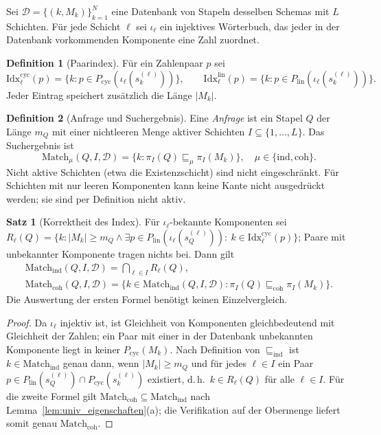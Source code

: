 \documentclass[a4paper,12pt, twoside]{report}
\theoremstyle{definition}
\newtheorem{definition}{Definition}
\newtheorem{satz}{Satz}
\begin{document}
Sei $\mathcal{D}=\{(k,M_k)\}_{k=1}^{N}$ eine Datenbank von Stapeln desselben Schemas mit $L$ Schichten. Für jede Schicht $\ell$ sei $\iota_\ell$ ein injektives Wörterbuch, das jeder in der Datenbank vorkommenden Komponente eine Zahl zuordnet.

\begin{definition}[Paarindex]
	Für ein Zahlenpaar $p$ sei
	\[
	\mathrm{Idx}^{\mathrm{cyc}}_\ell(p)=\{k : p\in P_{\mathrm{cyc}}(\iota_\ell(s_k^{(\ell)}))\},\qquad
	\mathrm{Idx}^{\mathrm{lin}}_\ell(p)=\{k : p\in P_{\mathrm{lin}}(\iota_\ell(s_k^{(\ell)}))\}.
	\]
	Jeder Eintrag speichert zusätzlich die Länge $|M_k|$.
\end{definition}

\begin{definition}[Anfrage und Suchergebnis]
	Eine \emph{Anfrage} ist ein Stapel $Q$ der Länge $m_Q$ mit einer nichtleeren Menge aktiver Schichten $I\subseteq\{1,\dots,L\}$. Das Suchergebnis ist
	\[
	\mathrm{Match}_\mu(Q,I,\mathcal{D})=\{k : \pi_I(Q)\sqsubseteq_\mu\pi_I(M_k)\},\quad \mu\in\{\mathrm{ind},\mathrm{coh}\}.
	\]
	Nicht aktive Schichten (etwa die Existenzschicht) sind nicht eingeschränkt. Für Schichten mit nur leeren Komponenten kann \glqq keine Kante\grqq{} nicht ausgedrückt werden; sie sind per Definition nicht aktiv.
\end{definition}

\begin{satz}[Korrektheit des Index]
	\label{satz:univ_index}
	Für $\iota_\ell$-bekannte Komponenten sei $R_\ell(Q)=\{k : |M_k|\ge m_Q \wedge \exists p\in P_{\mathrm{lin}}(\iota_\ell(s_Q^{(\ell)})):\ k\in\mathrm{Idx}^{\mathrm{cyc}}_\ell(p)\}$; Paare mit unbekannter Komponente tragen nichts bei. Dann gilt
	\begin{gather*}
	\mathrm{Match}_{\mathrm{ind}}(Q,I,\mathcal{D})=\bigcap_{\ell\in I}R_\ell(Q),\\
	\mathrm{Match}_{\mathrm{coh}}(Q,I,\mathcal{D})=\{k\in\mathrm{Match}_{\mathrm{ind}}(Q,I,\mathcal{D}) : \pi_I(Q)\sqsubseteq_{\mathrm{coh}}\pi_I(M_k)\}.
	\end{gather*}
	Die Auswertung der ersten Formel benötigt keinen Einzelvergleich.
\end{satz}

\begin{proof}
	Da $\iota_\ell$ injektiv ist, ist Gleichheit von Komponenten gleichbedeutend mit Gleichheit der Zahlen; ein Paar mit einer in der Datenbank unbekannten Komponente liegt in keiner $P_{\mathrm{cyc}}(M_k)$. Nach Definition von $\sqsubseteq_{\mathrm{ind}}$ ist $k\in\mathrm{Match}_{\mathrm{ind}}$ genau dann, wenn $|M_k|\ge m_Q$ und für jedes $\ell\in I$ ein Paar $p\in P_{\mathrm{lin}}(s_Q^{(\ell)})\cap P_{\mathrm{cyc}}(s_k^{(\ell)})$ existiert, d.\,h.\ $k\in R_\ell(Q)$ für alle $\ell\in I$. Für die zweite Formel gilt $\mathrm{Match}_{\mathrm{coh}}\subseteq\mathrm{Match}_{\mathrm{ind}}$ nach Lemma~\ref{lem:univ_eigenschaften}(a); die Verifikation auf der Obermenge liefert somit genau $\mathrm{Match}_{\mathrm{coh}}$.
\end{proof}
\end{document}
